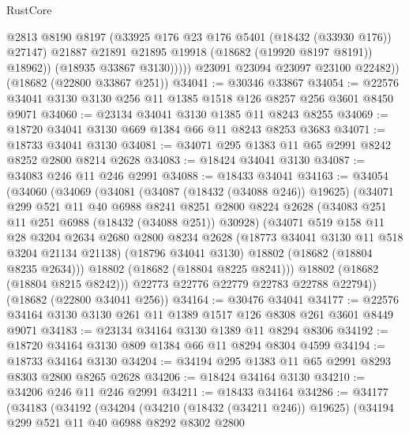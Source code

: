 \begin{lexlean}{RustCore}
\begin{coremodule}
                    @2813
                    @8190
                    @8197
                    (@33925 @176 @23 @176 @5401 (@18432 (@33930 @176)) @27147)
                    @21887
                    @21891
                    @21895
                    @19918
                    (@18682 (@19920 @8197 @8191))
                    @18962))
                (@18935 @33867 @3130)))))
        @23091
        @23094
        @23097
        @23100
        @22482))
    (@18682 (@22800 @33867 @251))
@34041 := @30346 @33867
@34054 := @22576 @34041 @3130 @3130 @256 @11 @1385 @1518 @126 @8257 @256 @3601 @8450 @9071
@34060 := @23134 @34041 @3130 @1385 @11 @8243 @8255
@34069 := @18720 @34041 @3130 @669 @1384 @66 @11 @8243 @8253 @3683
@34071 := @18733 @34041 @3130
@34081 := @34071 @295 @1383 @11 @65 @2991 @8242 @8252 @2800 @8214 @2628
@34083 := @18424 @34041 @3130
@34087 := @34083 @246 @11 @246 @2991
@34088 := @18433 @34041
@34163 := @34054
    (@34060
      (@34069
        (@34081
          (@34087 (@18432 (@34088 @246)) @19625)
          (@34071
            @299
            @521
            @11
            @40
            @6988
            @8241
            @8251
            @2800
            @8224
            @2628
            (@34083 @251 @11 @251 @6988 (@18432 (@34088 @251)) @30928)
            (@34071
              @519
              @158
              @11
              @28
              @3204
              @2634
              @2680
              @2800
              @8234
              @2628
              (@18773 @34041 @3130 @11 @518 @3204 @21134 @21138)
              (@18796 @34041 @3130)
              @18802
              (@18682 (@18804 @8235 @2634)))
            @18802
            (@18682 (@18804 @8225 @8241)))
          @18802
          (@18682 (@18804 @8215 @8242)))
        @22773
        @22776
        @22779
        @22783
        @22788
        @22794))
    (@18682 (@22800 @34041 @256))
@34164 := @30476 @34041
@34177 := @22576 @34164 @3130 @3130 @261 @11 @1389 @1517 @126 @8308 @261 @3601 @8449 @9071
@34183 := @23134 @34164 @3130 @1389 @11 @8294 @8306
@34192 := @18720 @34164 @3130 @809 @1384 @66 @11 @8294 @8304 @4599
@34194 := @18733 @34164 @3130
@34204 := @34194 @295 @1383 @11 @65 @2991 @8293 @8303 @2800 @8265 @2628
@34206 := @18424 @34164 @3130
@34210 := @34206 @246 @11 @246 @2991
@34211 := @18433 @34164
@34286 := @34177
    (@34183
      (@34192
        (@34204
          (@34210 (@18432 (@34211 @246)) @19625)
          (@34194
            @299
            @521
            @11
            @40
            @6988
            @8292
            @8302
            @2800

\end{coremodule}
\end{lexlean}
